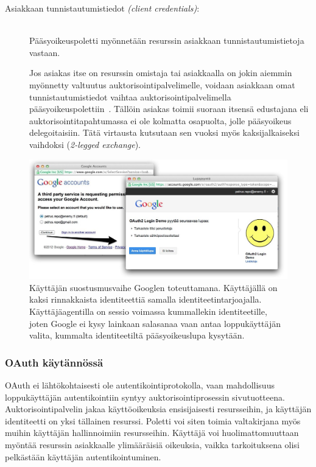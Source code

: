 \documentclass[finnish,gradu]{tktltiki}
\begin{document}
\begin{description}
   \item[Asiakkaan tunnistautumistiedot \emph{(client credentials)}:] \hfill \\
   Pääsyoikeuspoletti myönnetään resurssin asiakkaan tunnistautumistietoja vastaan.

  Jos asiakas itse on resurssin omistaja tai asiakkaalla on jokin aiemmin myönnetty valtuutus auktorisointipalvelimelle, voidaan asiakkaan omat tunnistautumistiedot vaihtaa auktorisointipalvelimella pääsyoikeuspolettiin~\cite{ietf_oauth2}. Tällöin asiakas toimii suoraan itsensä edustajana eli auktorisointitapahtumassa ei ole kolmatta osapuolta, jolle pääsyoikeus delegoitaisiin. Tätä virtausta kutsutaan sen vuoksi myös kaksijalkaiseksi vaihdoksi (\emph{2-legged exchange}).

   \end{description}



  \begin{figure}
    \centering
    \includegraphics[width=1.0\textwidth]{images/google_id_and_user_consent.jpg}
    \caption[OAuth-käyttäjäsuostumusvaihe Googlessa.]{Käyttäjän suostusmusvaihe Googlen toteuttamana. Käyttäjällä on kaksi rinnakkaista identiteettiä samalla identiteetintarjoajalla. Käyttäjäagentilla on sessio voimassa kummallekin identiteetille, joten Google ei kysy lainkaan salasanaa vaan antaa loppukäyttäjän valita, kummalta identiteetiltä pääsyoikeuslupa kysytään.}
    \label{fig:google_id_and_user_consent}
  \end{figure}


  \subsubsection{OAuth käytännössä} %
  \label{ssub:oauth_käytännössä}

  OAuth ei lähtökohtaisesti ole autentikointiprotokolla, vaan mahdollisuus loppukäyttäjän autentikointiin syntyy auktorisointiprosessin sivutuotteena. Auktorisointipalvelin jakaa käyttöoikeuksia ensisijaisesti resursseihin, ja käyttäjän identiteetti on yksi tällainen resurssi. Poletti voi siten toimia valtakirjana myös muihin käyttäjän hallinnoimiin resursseihin. Käyttäjä voi huolimattomuuttaan myöntää resurssin asiakkaalle ylimääräisiä oikeuksia, vaikka tarkoituksena olisi pelkästään käyttäjän autentikointuminen.
\end{document}
